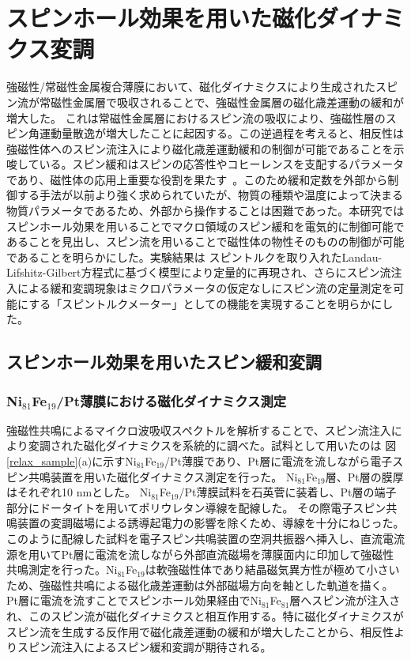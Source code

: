 
\chapter{スピンホール効果を用いた磁化ダイナミクス変調}\label{spintroquemeter}

強磁性/常磁性金属複合薄膜において、磁化ダイナミクスにより生成されたスピン流が常磁性金属層で吸収されることで、強磁性金属層の磁化歳差運動の緩和が増大した。
これは常磁性金属層におけるスピン流の吸収により、強磁性層のスピン角運動量散逸が増大したことに起因する。この逆過程を考えると、相反性は強磁性体へのスピン流注入により磁化歳差運動緩和の制御が可能であることを示唆している。スピン緩和はスピンの応答性やコヒーレンスを支配するパラメータであり、磁性体の応用上重要な役割を果たす~\cite{Chikazumi,Zutic,Kane}。このため緩和定数を外部から制御する手法が以前より強く求められていたが、物質の種類や温度によって決まる物質パラメータであるため、外部から操作することは困難であった。本研究ではスピンホール効果を用いることでマクロ領域のスピン緩和を電気的に制御可能であることを見出し、スピン流を用いることで磁性体の物性そのものの制御が可能であることを明らかにした。実験結果は
スピントルクを取り入れたLandau-Lifshitz-Gilbert方程式に基づく模型により定量的に再現され、さらにスピン流注入による緩和変調現象はミクロパラメータの仮定なしにスピン流の定量測定を可能にする「スピントルクメーター」としての機能を実現することを明らかにした。



\section{スピンホール効果を用いたスピン緩和変調}
\subsection{Ni$_{81}$Fe$_{19}$/Pt薄膜における磁化ダイナミクス測定}

強磁性共鳴によるマイクロ波吸収スペクトルを解析することで、スピン流注入により変調された磁化ダイナミクスを系統的に調べた。試料として用いたのは
図\ref{relax_sample}(a)に示すNi$_{81}$Fe$_{19}$/Pt薄膜であり、Pt層に電流を流しながら電子スピン共鳴装置を用いた磁化ダイナミクス測定を行った。
Ni$_{81}$Fe$_{19}$層、Pt層の膜厚はそれぞれ10 nmとした。
Ni$_{81}$Fe$_{19}$/Pt薄膜試料を石英菅に装着し、Pt層の端子部分にドータイトを用いてポリウレタン導線を配線した。
その際電子スピン共鳴装置の変調磁場による誘導起電力の影響を除くため、導線を十分にねじった。
このように配線した試料を電子スピン共鳴装置の空洞共振器へ挿入し、直流電流源を用いてPt層に電流を流しながら外部直流磁場を薄膜面内に印加して強磁性共鳴測定を行った。Ni$_{81}$Fe$_{19}$は軟強磁性体であり結晶磁気異方性が極めて小さいため、強磁性共鳴による磁化歳差運動は外部磁場方向を軸とした軌道を描く。
Pt層に電流を流すことでスピンホール効果経由でNi$_{81}$Fe$_{81}$層へスピン流が注入され、このスピン流が磁化ダイナミクスと相互作用する。特に磁化ダイナミクスがスピン流を生成する反作用で磁化歳差運動の緩和が増大したことから、相反性よりスピン流注入によるスピン緩和変調が期待される。





